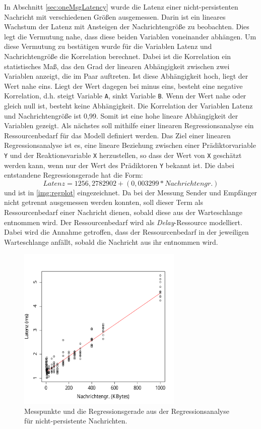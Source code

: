 In Abschnitt \ref{sec:oneMsgLatency} wurde die Latenz einer nicht-persistenten Nachricht mit verschiedenen Größen ausgemessen. Darin ist ein lineares Wachstum der Latenz mit Ansteigen der Nachrichtengröße zu beobachten. Dies legt die Vermutung nahe, dass diese beiden Variablen voneinander abhängen. Um diese Vermutung zu bestätigen wurde für die Variablen Latenz und Nachrichtengröße die Korrelation berechnet. Dabei ist die Korrelation ein statistisches Maß, das den Grad der linearen Abhängigkeit zwischen zwei Variablen anzeigt, die im Paar auftreten. Ist diese Abhängigkeit hoch, liegt der Wert nahe eins. Liegt der Wert dagegen bei minus eins, besteht eine negative Korrelation, d.h. steigt Variable \texttt{A}, sinkt Variable \texttt{B}. Wenn der Wert nahe oder gleich null ist, besteht keine Abhängigkeit. Die Korrelation der Variablen Latenz und Nachrichtengröße ist 0,99. Somit ist eine hohe lineare Abhängigkeit der Variablen gezeigt. Als nächstes soll mithilfe einer linearen Regressionsanalyse ein Ressourcenbedarf für das Modell definiert werden. Das Ziel einer linearen Regressionsanalyse ist es, eine lineare Beziehung zwischen einer Prädiktorvariable \texttt{Y} und der Reaktionsvariable \texttt{X} herzustellen, so dass der Wert von \texttt{X} geschätzt werden kann, wenn nur der Wert des Prädiktoren \texttt{Y} bekannt ist. Die dabei entstandene Regressionsgerade hat die Form: \[Latenz = 1256,2782902 + (0,003299 * Nachrichtengr.)\] und ist in \autoref{img:regplot} eingezeichnet. Da bei der Messung Sender und Empfänger nicht getrennt ausgemessen werden konnten, soll dieser Term als Ressourcenbedarf einer Nachricht dienen, sobald diese aus der Warteschlange entnommen wird. Der Ressourcenbedarf wird als \emph{Delay}-Ressource modelliert. Dabei wird die Annahme getroffen, dass der Ressourcenbedarf in der jeweiligen Warteschlange anfällt, sobald die Nachricht aus ihr entnommen wird. 
\begin{figure}[!ht]
\center
  \includegraphics[width=0.7\textwidth]{images/modelling/oneMsgRegression.pdf}
  \caption{Messpunkte und die Regressionsgerade aus der Regressionsanalyse für nicht-persistente Nachrichten.}
  \label{img:regplot}
\end{figure}

